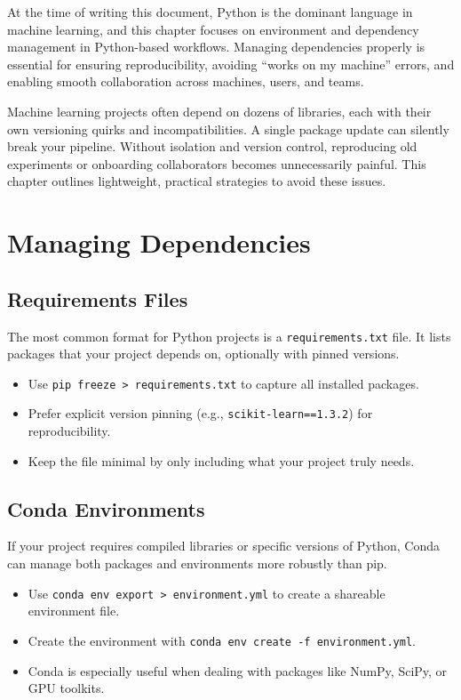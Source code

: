 \documentclass[12pt,openany]{book}
\begin{document}
At the time of writing this document, Python is the dominant language in machine learning, and this chapter focuses on environment and dependency management in Python-based workflows. Managing dependencies properly is essential for ensuring reproducibility, avoiding “works on my machine” errors, and enabling smooth collaboration across machines, users, and teams. \newline

Machine learning projects often depend on dozens of libraries, each with their own versioning quirks and incompatibilities. A single package update can silently break your pipeline. Without isolation and version control, reproducing old experiments or onboarding collaborators becomes unnecessarily painful. This chapter outlines lightweight, practical strategies to avoid these issues.



\section{Managing Dependencies}


\subsection{Requirements Files}

The most common format for Python projects is a \texttt{requirements.txt} file. It lists packages that your project depends on, optionally with pinned versions.

\begin{itemize}
    \item Use \texttt{pip freeze > requirements.txt} to capture all installed packages.
    \item Prefer explicit version pinning (e.g., \texttt{scikit-learn==1.3.2}) for reproducibility.
    \item Keep the file minimal by only including what your project truly needs.
\end{itemize}


\subsection{Conda Environments}

If your project requires compiled libraries or specific versions of Python, Conda can manage both packages and environments more robustly than pip.

\begin{itemize}
    \item Use \texttt{conda env export > environment.yml} to create a shareable environment file.
    \item Create the environment with \texttt{conda env create -f environment.yml}.
    \item Conda is especially useful when dealing with packages like NumPy, SciPy, or GPU toolkits.
\end{itemize}
\end{document}
